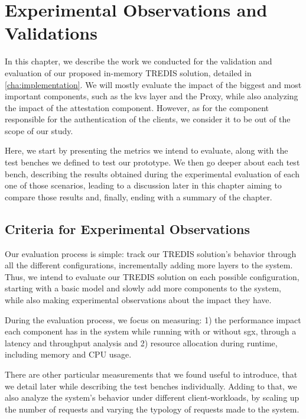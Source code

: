 \chapter{Experimental Observations and Validations}
\label{cha:experimentalEvaluation}

In this chapter, we describe the work we conducted for the validation and evaluation of our proposed in-memory TREDIS solution, detailed in \ref{cha:implementation}. We will mostly evaluate the impact of the biggest and most important components, such as the \gls{kvs} layer and the Proxy, while also analyzing the impact of the attestation component. However, as for the component responsible for the authentication of the clients, we consider it to be out of the scope of our study.

Here, we start by presenting the metrics we intend to evaluate, along with the test benches we defined to test our prototype.
We then go deeper about each test bench, describing the results obtained during the experimental evaluation of each one of those scenarios, leading to a discussion later in this chapter aiming to compare those results and, finally, ending with a summary of the chapter.


\section{Criteria for Experimental Observations}
\label{sec:criteriaForExperimentalObservations}

Our evaluation process is simple: track our TREDIS solution's behavior through all the different configurations, incrementally adding more layers to the system. Thus, we intend to evaluate our TREDIS solution on each possible configuration, starting with a basic model and slowly add more components to the system, while also making experimental observations about the impact they have. 

During the evaluation process, we focus on measuring: 1) the performance impact each component has in the system while running with or without \gls{sgx}, through a latency and throughput analysis and 2) resource allocation during runtime, including memory and CPU usage. 

There are other particular measurements that we found useful to introduce, that we detail later while describing the test benches individually.
Adding to that, we also analyze the system's behavior under different client-workloads, by scaling up the number of requests and varying the typology of requests made to the system.


